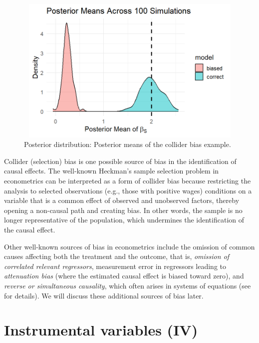 \begin{figure}[h!]
	\includegraphics[width=340pt, height=200pt]{Chapters/chapter12/figures/FigColliderBias.png}
	\caption[List of figure caption goes here]{Posterior distribution: Posterior means of the collider bias example.}\label{fig12_2}
\end{figure}

Collider (selection) bias is one possible source of bias in the identification of causal effects. The well-known Heckman’s sample selection problem in econometrics \cite{heckman1979sample} can be interpreted as a form of collider bias because restricting the analysis to selected observations (e.g., those with positive wages) conditions on a variable that is a common effect of observed and unobserved factors, thereby opening a non-causal path and creating bias. In other words, the sample is no longer representative of the population, which undermines the identification of the causal effect. 

Other well-known sources of bias in econometrics include the omission of common causes affecting both the treatment and the outcome, that is, \textit{omission of correlated relevant regressors}, measurement error in regressors leading to \textit{attenuation bias} (where the estimated causal effect is biased toward zero), and \textit{reverse or simultaneous causality}, which often arises in systems of equations (see \cite{wooldridge2010econometric} for details). We will discuss these additional sources of bias later.

\section{Instrumental variables (IV)}\label{chap12_4}

